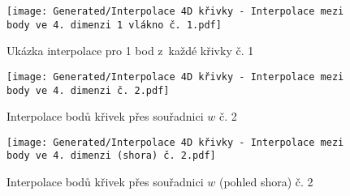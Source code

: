 \begin{imagepage}
    \begin{figure}[H]
        \centering
        \texttt{[image: Generated/Interpolace 4D křivky - Interpolace mezi body ve 4. dimenzi 1 vlákno č. 1.pdf]}
        \caption{Ukázka interpolace pro 1 bod z~každé křivky č. 1}
        \label{fig:Demo 4D Interpolace mezi body přes souřadnici w konst x 1}
    \end{figure}
\end{imagepage}
\begin{imagepage}
    \begin{figure}[H]
        \centering
        \texttt{[image: Generated/Interpolace 4D křivky - Interpolace mezi body ve 4. dimenzi č. 2.pdf]}
        \caption{Interpolace bodů křivek přes souřadnici $w$ č. 2}
        \label{fig:Demo 4D Interpolace mezi body přes souřadnici w 2}
    \end{figure}
    \begin{figure}[H]
        \centering
        \texttt{[image: Generated/Interpolace 4D křivky - Interpolace mezi body ve 4. dimenzi (shora) č. 2.pdf]}
        \caption{Interpolace bodů křivek přes souřadnici $w$ (pohled shora) č. 2}
        \label{fig:Demo 4D Interpolace mezi body přes souřadnici w shora 2}
    \end{figure}
\end{imagepage}

